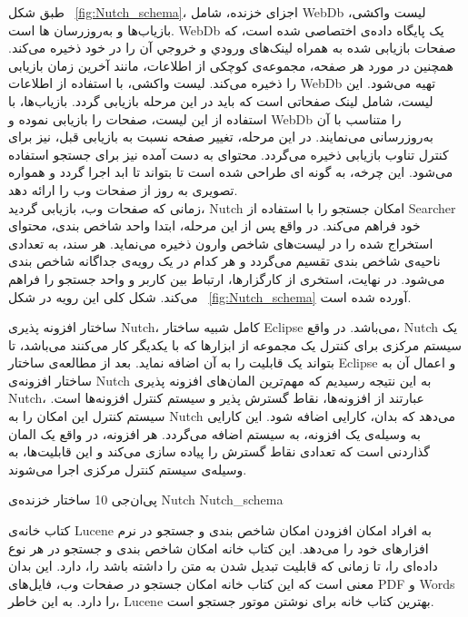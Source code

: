 طبق شکل ~\ref{fig:Nutch_schema}، اجزای خزنده، شامل WebDb لیست واکشی، بازیاب‌ها و به‌روزرسان ها است. WebDb یک پایگاه داده‌ی اختصاصی شده است، که صفحات بازیابی شده به همراه لینک‌های ورودي و خروجي آن را در خود ذخیره می‌کند. همچنین در مورد هر صفحه، مجموعه‌ی کوچکی از اطلاعات، مانند آخرین زمان بازیابی را ذخیره می‌کند. لیست واکشی، با استفاده از اطلاعات WebDb تهیه می‌شود.  این لیست، شامل لینک صفحاتی است که باید در این مرحله بازیابی گردد. بازیاب‌ها، با استفاده از  این لیست، صفحات را بازیابی نموده و WebDb را متناسب با آن به‌روزرسانی می‌نمایند. در این مرحله، تغییر صفحه نسبت به بازیابی قبل، نیز برای کنترل تناوب بازیابی ذخیره می‌گردد. محتوای به دست آمده نیز برای جستجو استفاده می‌شود. این چرخه، به گونه ای طراحی شده است تا بتواند تا ابد اجرا گردد و همواره تصویری به روز از صفحات وب را ارائه دهد.
\\
زمانی که صفحات وب، بازیابی گردید، Nutch امکان جستجو را با استفاده از Searcher خود فراهم می‌کند. در واقع پس از این مرحله، ابتدا واحد شاخص بندی، محتوای استخراج شده را در لیست‌های شاخص وارون ذخیره می‌نماید. هر سند، به تعدادی ناحیه‌ی شاخص بندی تقسیم می‌گردد و هر کدام در یک رویه‌ی جداگانه شاخص بندی می‌شود. در نهایت، استخری از کارگزارها، ارتباط بین کاربر و واحد جستجو را فراهم می‌کند. شکل کلی این رویه در شکل ~\ref{fig:Nutch_schema} آورده شده است.

ساختار افزونه پذیری Nutch، کامل شبیه ساختار Eclipse می‌باشد. در واقع، Nutch یک سیستم مرکزی برای کنترل یک مجموعه از ابزارها که با یکدیگر کار می‌کنند می‌باشد، تا بتواند یک قابليت را به آن اضافه نمايد. بعد از مطالعه‌ی ساختار Eclipse و اعمال آن به ساختار افزونه‌ی Nutch به این نتیجه رسیدیم که مهم‌ترین المان‌های افزونه پذیری Nutch، عبارتند از افزونه‌ها، نقاط گسترش پذیر و سیستم کنترل افزونه‌ها است. سیستم کنترل این امکان را به Nutch می‌دهد که بدان، کارایی اضافه شود. این کارایی به وسیله‌ی یک افزونه، به سیستم اضافه می‌گردد. هر افزونه، در واقع یک المان گذاردنی است که تعدادی نقاط گسترش را پیاده سازی می‌کند و این قابلیت‌ها، به وسیله‌ی سیستم کنترل مرکزی اجرا می‌شوند.

‌پی‌ان‌جی {10} {ساختار خزنده‌ی Nutch} {Nutch_schema}


کتاب خانه‌ی Lucene به افراد امکان افزودن امکان شاخص بندی و جستجو در نرم افزارهای خود را می‌دهد. این کتاب خانه امکان شاخص بندی و جستجو در هر نوع داده‌ای را، تا زمانی که قابلیت تبدیل شدن به متن را داشته باشد را، دارد. این بدان معنی است که این کتاب خانه امکان جستجو در صفحات وب، فایل‌های PDF و Words را دارد. به این خاطر، Lucene بهترین کتاب خانه برای نوشتن موتور جستجو است.

